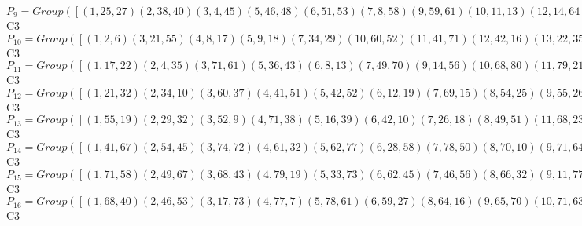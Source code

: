 \documentclass[varwidth=\maxdimen,border=10]{standalone}
\begin{document}
\begin{tabular}
$P_{9} = Group( [ ( 1,25,27)( 2,38,40)( 3, 4,45)( 5,46,48)( 6,51,53)( 7, 8,58)( 9,59,61)(10,11,13)(12,14,64)(15,65,66)(16,17,67)(18,68,70)(19,20,22)(21,23,73)(24,74,75)(26,28,30)(29,31,76)(32,33,35)(34,36,77)(37,78,79)(39,41,43)(42,44,80)(47,49,50)(52,54,56)(55,57,81)(60,62,63)(69,71,72) ] )\cong$ C3\ \\
$P_{10} = Group( [ ( 1, 2, 6)( 3,21,55)( 4, 8,17)( 5, 9,18)( 7,34,29)(10,60,52)(11,41,71)(12,42,16)(13,22,35)(14,23,36)(15,24,37)(19,69,26)(20,54,49)(25,74,68)(27,61,79)(28,62,33)(30,43,56)(31,44,57)(32,47,39)(38,78,46)(40,70,66)(45,80,77)(48,75,53)(50,63,72)(51,65,59)(58,81,64)(67,76,73) ] )\cong$ C3\ \\
$P_{11} = Group( [ ( 1,17,22)( 2, 4,35)( 3,71,61)( 5,36,43)( 6, 8,13)( 7,49,70)( 9,14,56)(10,68,80)(11,79,21)(12,33,75)(15,57,63)(16,62,48)(18,23,30)(19,46,81)(20,66,34)(24,31,72)(25,77,60)(26,78,58)(27,55,41)(28,53,42)(29,54,40)(32,59,76)(37,44,50)(38,64,69)(39,65,67)(45,52,74)(47,51,73) ] )\cong$ C3\ \\
$P_{12} = Group( [ ( 1,21,32)( 2,34,10)( 3,60,37)( 4,41,51)( 5,42,52)( 6,12,19)( 7,69,15)( 8,54,25)( 9,55,26)(11,74,57)(13,61,67)(14,62,68)(16,47,24)(17,28,38)(18,29,39)(20,78,31)(22,70,45)(23,71,46)(27,80,72)(30,75,77)(33,65,44)(35,48,58)(36,49,59)(40,81,50)(43,79,64)(53,76,63)(56,66,73) ] )\cong$ C3\ \\
$P_{13} = Group( [ ( 1,55,19)( 2,29,32)( 3,52, 9)( 4,71,38)( 5,16,39)( 6,42,10)( 7,26,18)( 8,49,51)(11,68,23)(12,69,24)(13,79,58)(14,33,59)(15,34,60)(17,62,25)(20,46,36)(21,47,37)(22,66,67)(27,77,43)(28,78,44)(30,53,73)(31,54,74)(35,75,45)(40,64,56)(41,65,57)(48,81,63)(50,70,80)(61,76,72) ] )\cong$ C3\ \\
$P_{14} = Group( [ ( 1,41,67)( 2,54,45)( 3,74,72)( 4,61,32)( 5,62,77)( 6,28,58)( 7,78,50)( 8,70,10)( 9,71,64)(11,80,37)(12,38,35)(13,21,51)(14,75,52)(15,20,81)(16,65,63)(17,48,19)(18,49,73)(22,34,25)(23,79,26)(24,33,76)(27,60,57)(29,59,56)(30,42,68)(31,40,69)(36,66,39)(43,55,46)(44,53,47) ] )\cong$ C3\ \\
$P_{15} = Group( [ ( 1,71,58)( 2,49,67)( 3,68,43)( 4,79,19)( 5,33,73)( 6,62,45)( 7,46,56)( 8,66,32)( 9,11,77)(10,17,75)(12,78,63)(13,55,38)(14,53,39)(15,54,80)(16,59,30)(18,20,64)(21,65,72)(22,29,51)(23,27,52)(24,28,81)(25,35,42)(26,36,40)(31,70,60)(34,74,50)(37,41,76)(44,48,69)(47,57,61) ] )\cong$ C3\ \\
$P_{16} = Group( [ ( 1,68,40)( 2,46,53)( 3,17,73)( 4,77, 7)( 5,78,61)( 6,59,27)( 8,64,16)( 9,65,70)(10,71,63)(11,35,39)(12,36,80)(13,52,20)(14,81,21)(15,51,75)(18,74,48)(19,49,72)(22,26,33)(23,76,34)(24,25,79)(28,56,60)(29,57,58)(30,69,41)(31,67,42)(32,62,50)(37,38,66)(43,47,54)(44,45,55) ] )\cong$ C3\ \\

\end{tabular}
\end{document}
